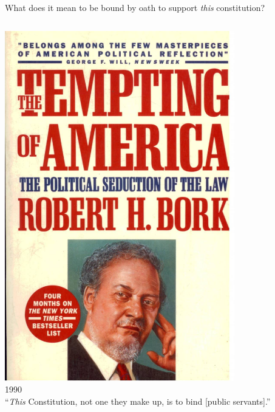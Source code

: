 \begin{frame}{What does it mean to be bound by oath to support \emph{this} constitution?}
    \begin{columns}[onlytextwidth]
            \centering
            \includegraphics[width=0.75\textwidth]{img/bork-book.jpg} \\
            1990 \\

            ``\emph{This} Constitution, not one they make up, is to bind [public servants].''

    \end{columns}
\end{frame}

